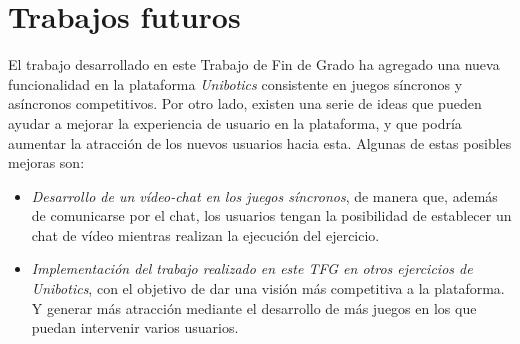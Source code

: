 \documentclass[a4paper, 12pt]{book}
\begin{document}
\section{Trabajos futuros}
\label{sec:trabajos_futuros}

El trabajo desarrollado en este Trabajo de Fin de Grado ha agregado una nueva funcionalidad en la plataforma \emph{Unibotics} consistente en juegos síncronos y asíncronos competitivos. Por otro lado, existen una serie de ideas que pueden ayudar a mejorar la experiencia de usuario en la plataforma, y que podría aumentar la atracción de los nuevos usuarios hacia esta. Algunas de estas posibles mejoras son:

\begin{itemize}
\item \emph{Desarrollo de un vídeo-chat en los juegos síncronos}, de manera que, además de comunicarse por el chat, los usuarios tengan la posibilidad de establecer un chat de vídeo mientras realizan la ejecución del ejercicio.

\item \emph{Implementación del trabajo realizado en este TFG en otros ejercicios de Unibotics}, con el objetivo de dar una visión más competitiva a la plataforma. Y generar más atracción mediante el desarrollo de más juegos en los que puedan intervenir varios usuarios.
\end{itemize}




\end{document}
